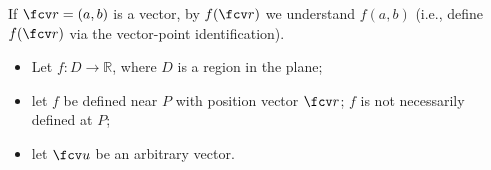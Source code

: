 \begin{frame}
If $\fcv r =( a,b )$ is a vector, by $f(\fcv r) $ we understand $f(a,b) $ (i.e., define $f(\fcv r)$ via the vector-point identification).
\begin{definition}
\begin{itemize}
\item<2-> Let $f: D\to \mathbb R$, where $D$ is a region in the plane;
\item<3-> let  $f$ be defined near $P$ with position vector $\fcv r$; $f$ is not necessarily defined at $P$;
\item<4-> let $\fcv u$ be an arbitrary vector.
\end{itemize}
\end{definition}
\end{frame}
